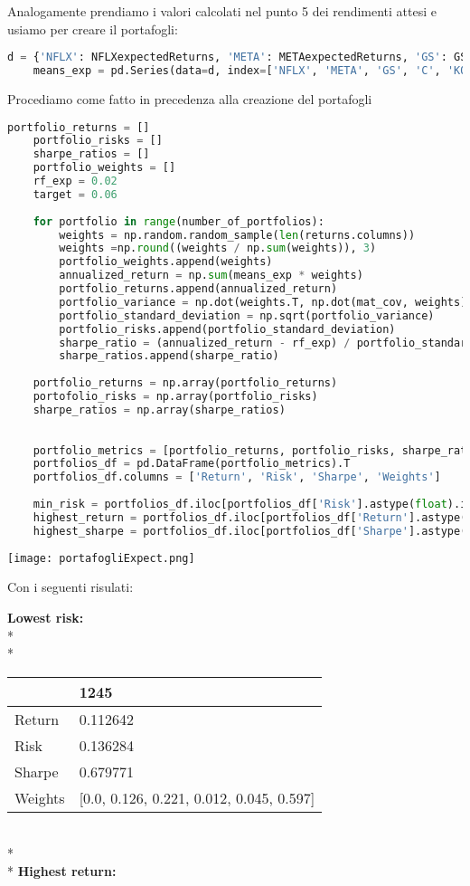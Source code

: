 \documentclass{report}
\begin{document}
Analogamente prendiamo i valori calcolati nel punto 5 dei rendimenti attesi e usiamo per creare il portafogli:
\begin{lstlisting}[language=python]
    d = {'NFLX': NFLXexpectedReturns, 'META': METAexpectedReturns, 'GS': GSexpectedReturns, 'C': CexpectedReturns, 'KO': KOexpectedReturns, 'PEP': PEPexpectedReturns}
    means_exp = pd.Series(data=d, index=['NFLX', 'META', 'GS', 'C', 'KO', 'PEP'])
\end{lstlisting}
Procediamo come fatto in precedenza alla creazione del portafogli
\begin{lstlisting}[language=python]
    portfolio_returns = []
    portfolio_risks = []
    sharpe_ratios = []
    portfolio_weights = []
    rf_exp = 0.02
    target = 0.06
    
    for portfolio in range(number_of_portfolios):
        weights = np.random.random_sample(len(returns.columns))
        weights =np.round((weights / np.sum(weights)), 3)
        portfolio_weights.append(weights)
        annualized_return = np.sum(means_exp * weights)
        portfolio_returns.append(annualized_return)
        portfolio_variance = np.dot(weights.T, np.dot(mat_cov, weights))
        portfolio_standard_deviation = np.sqrt(portfolio_variance)
        portfolio_risks.append(portfolio_standard_deviation)
        sharpe_ratio = (annualized_return - rf_exp) / portfolio_standard_deviation
        sharpe_ratios.append(sharpe_ratio)
    
    portfolio_returns = np.array(portfolio_returns)
    portofolio_risks = np.array(portfolio_risks)
    sharpe_ratios = np.array(sharpe_ratios)
    
    
    portfolio_metrics = [portfolio_returns, portfolio_risks, sharpe_ratios, portfolio_weights]
    portfolios_df = pd.DataFrame(portfolio_metrics).T
    portfolios_df.columns = ['Return', 'Risk', 'Sharpe', 'Weights']
    
    min_risk = portfolios_df.iloc[portfolios_df['Risk'].astype(float).idxmin()]
    highest_return = portfolios_df.iloc[portfolios_df['Return'].astype(float).idxmax()]
    highest_sharpe = portfolios_df.iloc[portfolios_df['Sharpe'].astype(float).idxmax()]
\end{lstlisting}

\texttt{[image: portafogliExpect.png]}
\newpage

Con i seguenti risulati:

\textbf{Lowest risk:}
\\*
\\*
\begin{tabular}{ll}
\toprule
{} &                                      1245 \\
\midrule
Return  &                                  0.112642 \\
Risk    &                                  0.136284 \\
Sharpe  &                                  0.679771 \\
Weights &  [0.0, 0.126, 0.221, 0.012, 0.045, 0.597] \\
\bottomrule
\end{tabular}
\\*
\\*
\textbf{Highest return:}
\end{document}
